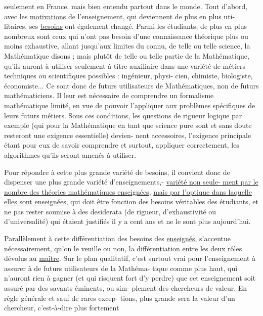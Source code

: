 
seulement en France, mais bien entendu partout dans le monde. Tout d'abord,
avec les \uline{motivations} de l'enseignement, qui deviennent de plus en plus uti-%
litaires, ses \uline{besoins} ont également changé. Parmi les étudiants, de plus en
plus nombreux sont ceux qui n'ont pas besoin d'une connaissance théorique plus
ou moins exhaustive, allant jusqu'aux limites du connu, de telle ou telle
science, la Mathématique disons ; mais plutôt de telle ou telle partie de la
Mathématique, qu'ils auront à utiliser seulement à titre auxiliaire dans une
variété de métiers techniques ou scientifiques possibles : ingénieur, physi-%
cien, chimiste, biologiste, économiste... Ce sont donc de futurs utilisateurs
de Mathématiques, non de futurs mathématiciens. Il leur est nécessaire de
comprendre un formalisme mathématique limité, en vue de pouvoir l'appliquer
aux problèmes spécifiques de leurs futurs métiers. Sous ces conditions, les
questions de rigueur logique par exemple (qui pour la Mathématique en tant
que science pure sont et sans doute resteront une exigence essentielle) devien-%
nent accessoires, l'exigence principale étant pour eux de savoir comprendre
et surtout, appliquer correctement, les algorithmes qu'ils seront amenés à
utiliser.

Pour répondre à cette plus grande variété de besoins, il convient
donc de dispenser une plus grande variété d'enseignements,- \uline{variété non seule-%
ment par le nombre des théories mathématiques enseignées}, \uline{mais par l'optique
dans laquelle elles sont enseignées}, qui doit être fonction des besoins
véritables des étudiants, et ne pas rester soumise à des desiderata (de
rigueur, d'exhaustivité ou d'universalité) qui étaient justifiés il y a cent
ans et ne le sont plus aujourd'hui.

Parallèlement à cette différentiation des besoins des \uline{enseignés},
s'accentue nécessairement, qu'on le veuille ou non, la différentiation entre
les deux rôles dévolus au \uline{maître}. Sur le plan qualitatif, c'est surtout
vrai pour l'enseignement à assurer à de futurs utilisateurs de la Mathéma-%
tique comme plus haut, qui n'auront rien à gagner (et qui risquent fort d'y
perdre) que cet enseignement soit assuré par des savants éminents, ou sim-%
plement des chercheurs de valeur. En règle générale et sauf de rares excep-%
tions, plus grande sera la valeur d'un chercheur, c'est-à-dire plus fortement

